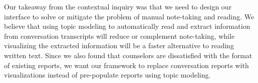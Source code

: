 Our takeaway from the contextual inquiry was that we need to design our
interface to solve or mitigate the problem of manual note-taking and reading. We believe
that using topic modeling to automatically read and extract information from
conversation transcripts will reduce or complement note-taking, while visualizing the
extracted information will be a faster alternative to reading written text. Since we
also found that counselors are dissatisfied with the format of existing reports, we
want our framework to replace conversation reports with visualizations instead of
pre-populate reports using topic modeling.
